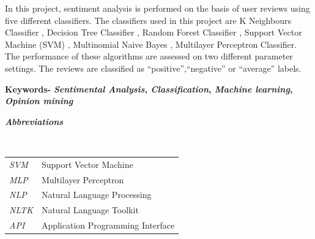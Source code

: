 \documentclass[a4paper, 12pt]{report}
\begin{document}
\begin{frontmatter}
In this project, sentiment analysis is performed on the basis of user reviews using five different
classifiers. The classifiers used in this project are K Neighbours Classifier , 
Decision Tree Classifier , Random Forest Classifier , Support Vector Machine (SVM) , Multinomial Naive Bayes , Multilayer Perceptron Classifier. The performance of these algorithms are assessed on two different parameter
settings. The reviews are classified as “positive”,“negative” or “average” labels.
	\vspace{0.3cm}
	
	\textbf{Keywords- }\textbf{\textit{Sentimental Analysis}, \textit{Classification}, \textit{Machine learning}, \textit{Opinion mining}}


\newpage
\thispagestyle{empty}
\begin{center}
	\begin{LARGE}
		\textbf{\textit {Abbreviations}}\end{LARGE}\\[1.2cm]
\end{center}

\begin{table}[h]
	\begin{tabular}{ll}			
		\textit{SVM} & Support Vector Machine \\
		\textit{MLP} & Multilayer Perceptron \\	
		\textit{NLP} & Natural Language Processing \\	
		\textit{NLTK} & Natural Language Toolkit \\	
		\textit{API} & Application Programming Interface \\	
	\end{tabular}
\end{table}

\pagebreak
{}
\setcounter{page}{1}
\newpage
\tableofcontents
\listoffigures
\newpage


\end{frontmatter}

\newpage
{}
\end{document}
